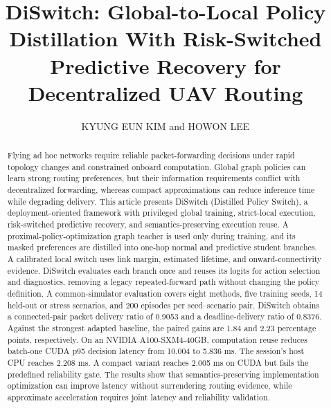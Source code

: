 \documentclass{ieeeaccess}
\newcommand{\MustEdit}[1]{\textcolor{ReviewRed}{#1}}
\newcommand{\VerifyEdit}[1]{\textcolor{ReviewBlue}{#1}}
\begin{document}

\title{\VerifyEdit{DiSwitch: Global-to-Local Policy Distillation With Risk-Switched Predictive Recovery for Decentralized UAV Routing}}
\author{\MustEdit{\uppercase{Kyung Eun Kim} and \uppercase{Howon Lee}\authorrefmark{1}}}
\address[1]{\MustEdit{Department of Military Digital Convergence, Ajou University, Suwon 16499, Republic of Korea}}
\corresp{\MustEdit{Corresponding author: Howon Lee (insert the final institutional e-mail address before submission).}}

\begin{abstract}
\color{ReviewBlue}
Flying ad hoc networks require reliable packet-forwarding decisions under rapid topology changes and constrained onboard computation. Global graph policies can learn strong routing preferences, but their information requirements conflict with decentralized forwarding, whereas compact approximations can reduce inference time while degrading delivery. This article presents DiSwitch (Distilled Policy Switch), a deployment-oriented framework with privileged global training, strict-local execution, risk-switched predictive recovery, and semantics-preserving execution reuse. A proximal-policy-optimization graph teacher is used only during training, and its masked preferences are distilled into one-hop normal and predictive student branches. A calibrated local switch uses link margin, estimated lifetime, and onward-connectivity evidence. DiSwitch evaluates each branch once and reuses its logits for action selection and diagnostics, removing a legacy repeated-forward path without changing the policy definition. A common-simulator evaluation covers eight methods, five training seeds, 14 held-out or stress scenarios, and 200 episodes per seed--scenario pair. DiSwitch obtains a connected-pair packet delivery ratio of 0.9053 and a deadline-delivery ratio of 0.8376. Against the strongest adapted baseline, the paired gains are 1.84 and 2.23 percentage points, respectively. On an NVIDIA A100-SXM4-40GB, computation reuse reduces batch-one CUDA p95 decision latency from 10.004 to 5.836 ms. The session's host CPU reaches 2.208 ms. A compact variant reaches 2.005 ms on CUDA but fails the predefined reliability gate. The results show that semantics-preserving implementation optimization can improve latency without surrendering routing evidence, while approximate acceleration requires joint latency and reliability validation.
\end{abstract}
\end{document}
